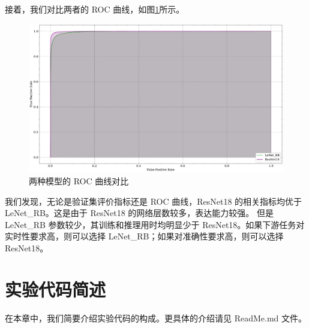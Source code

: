 \documentclass[supercite]{Experimental_Report}
\theoremstyle{definition}
\begin{document}
接着，我们对比两者的 ROC 曲线，如图\ref{模型对比ROC曲线}所示。
\begin{figure}[H]
	\begin{center}
		\includegraphics[scale=0.45]{../images/模型对比ROC曲线.pdf}
		\caption{两种模型的 ROC 曲线对比}
		\label{模型对比ROC曲线}
	\end{center}
\end{figure}
  
我们发现，无论是验证集评价指标还是 ROC 曲线，ResNet18 的相关指标均优于 LeNet\_RB。这是由于 ResNet18 的网络层数较多，表达能力较强。
但是 LeNet\_RB 参数较少，其训练和推理用时均明显少于 ResNet18。如果下游任务对实时性要求高，则可以选择 LeNet\_RB；如果对准确性要求高，则可以选择 ResNet18。

\section{实验代码简述}
在本章中，我们简要介绍实验代码的构成。更具体的介绍请见 ReadMe.md 文件。
\end{document}
